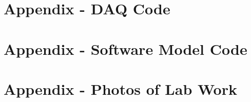\documentclass[12pt,a4paper]{scrreprt}
\begin{document}
\onehalfspacing

\begin{titlepage}
    \maketitle
    \thispagestyle{empty}
\end{titlepage}

\tableofcontents
\thispagestyle{empty}
\clearpage

\listoffigures
\thispagestyle{empty}

\listoftables
\thispagestyle{empty}

\listofequations




\clearpage
















\appendix
\chapter{Appendix - DAQ Code}


\chapter{Appendix - Software Model Code}


\chapter{Appendix - Photos of Lab Work}

\end{document}
